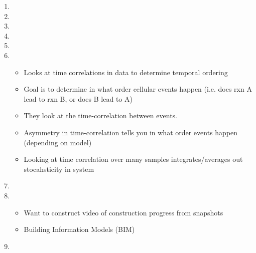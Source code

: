 \documentclass[12pt]{article}
\begin{document}
\begin{enumerate}
\item {}

\item {}
  
\item {}

\item {}

\item {}

\item {}
\begin{itemize}
	\item Looks at time correlations in data to determine temporal ordering
	\item Goal is to determine in what order cellular events happen (i.e. does rxn A lead to rxn B, or does B lead to A)
	\item They look at the time-correlation between events.
	\item Asymmetry in time-correlation tells you in what order events happen (depending on model)
	\item Looking at time correlation over many samples integrates/averages out stocahsticity in system
\end{itemize}

\item {}

\item {}
\begin{itemize}
	\item Want to construct video of construction progress from snapshots
	\item Building Information Models (BIM) 
\end{itemize}

\item {}

\end{enumerate}
\end{document}
